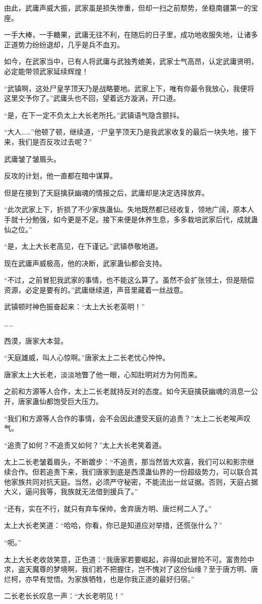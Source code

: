 \begin{this_body}
由此，武庸声威大振，武家虽是损失惨重，但却一扫之前颓势，坐稳南疆第一的宝座。

一手大棒，一手糖果，武庸无往不利，在随后的日子里，成功地收服失地，让诸多正道势力纷纷退却，几乎是兵不血刃。

如今，在武家当中，已有人将武庸与武独秀媲美，武家士气高昂，认定武庸贤明，必定能带领武家延续辉煌！

“武镇啊，这处尸皇芋顶天乃是战略要地。武家上下，唯有你最令我放心，我便将这里交予你了。”武庸头也不回，望着远方漩涡，开口道。

“是，在下一定不负太上大长老所托。”武镇语气隐含颤抖。

“大人……”他顿了顿，继续道，“尸皇芋顶天乃是我武家收复的最后一块失地，接下来，我们是否反攻过去呢？”

武庸皱了皱眉头。

反攻的计划，他一直都在暗中谋算。

但是在接到了天庭擒获幽魂的情报之后，武庸却是决定选择放弃。

“此次武家上下，折损了不少家族蛊仙。失地既然都已经收复，领地广阔，原本人手就十分勉强，如今更是不足。接下来便是休养生息，多多栽培武家后代，成就蛊仙之位。”

“是，太上大长老高见，在下谨记。”武镇恭敬地道。

现在武庸声威极高，他的决断，武家蛊仙都会支持。

“不过，之前冒犯我武家的事情，也不能这么算了。虽然不会扩张领土，但是赔偿资源，必定是要有的。”武庸继续道，声音里藏着一丝战意。

武镇顿时神色振奋起来：“太上大长老英明！”

……

西漠，唐家大本营。

“天庭雄威，叫人心惊啊。”唐家太上二长老忧心忡忡。

唐家太上大长老，淡淡地瞥了他一眼，心知肚明对方为何而来。

之前和方源等人合作，太上二长老就持反对的态度。如今天庭擒获幽魂的消息一公开，唐家蛊仙都饱受巨大压力。

“我们和方源等人合作的事情，会不会因此遭受天庭的追责？”太上二长老唉声叹气。

“追责了如何？不追责又如何？”太上大长老笑着道。

太上二长老皱着眉头，不断踱步：“不追责，那当然皆大欢喜，我们可以和影宗继续合作。但若追责下来，我们唐家到底是西漠蛊仙界的一份超级势力，可以联合其他家族共同对抗天庭。当然，必须严守秘密，不能流出一丝证据。否则，天庭占据大义，逼问我等，我族就无法借到援兵了。”

“还有，实在不行，就只有弃车保帅，舍弃唐方明、唐烂柯二人了。”

太上大长老笑道：“哈哈，你看，你已是知道应对举措，还慌张什么？”

“呃。”

太上大长老收敛笑意，正色道：“我唐家若要崛起，非得如此冒险不可。富贵险中求，盗天魔尊的梦境啊，我们若不把握住，岂不愧对了这份仙缘？至于唐方明、唐烂柯，亦早有觉悟。为家族牺牲，也是你我正道的最好归宿。”

二长老长长叹息一声：“大长老明见！”

\end{this_body}

